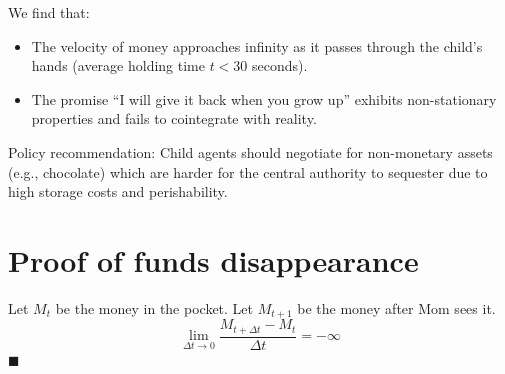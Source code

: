 \documentclass[AER]{AEA}
\newcommand{\qed}{\nolinebreak\hfill\ensuremath{\blacksquare}\par}
\begin{document}
We find that:
\begin{itemize}
    \item The velocity of money approaches infinity as it passes through the child's hands (average holding time $t < 30$ seconds).
    \item The promise ``I will give it back when you grow up'' exhibits non-stationary properties and fails to cointegrate with reality.
\end{itemize}

Policy recommendation: Child agents should negotiate for non-monetary assets (e.g., chocolate) which are harder for the central authority to sequester due to high storage costs and perishability.

\nocite{*}



\appendix
\section{Proof of funds disappearance}
Let $M_t$ be the money in the pocket. Let $M_{t+1}$ be the money after Mom sees it.
$$ \lim_{\Delta t \to 0} \frac{M_{t+\Delta t} - M_t}{\Delta t} = -\infty $$ \qed
\end{document}
